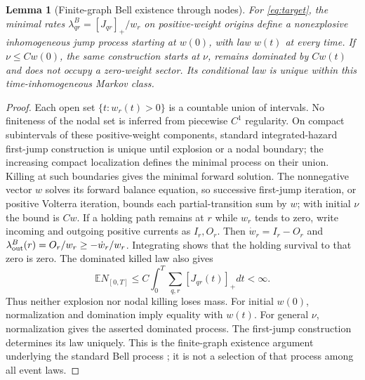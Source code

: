 \documentclass[11pt]{article}
\newtheorem{lemma}[theorem]{Lemma}
\theoremstyle{definition}\newtheorem{definition}[theorem]{Definition}
\theoremstyle{remark}\newtheorem{remark}[theorem]{Remark}
\begin{document}
\begin{lemma}[Finite-graph Bell existence through nodes]\label{kin:existence}
For \eqref{eq:target}, the minimal rates
$\lambda^B_{qr}=[J_{qr}]_+/w_r$ on positive-weight origins define a
nonexplosive inhomogeneous jump process starting at $w(0)$, with law
$w(t)$ at every time. If $\nu\le Cw(0)$, the same construction starts at
$\nu$, remains dominated by $Cw(t)$ and does not occupy a zero-weight
sector. Its conditional law is unique within this time-inhomogeneous
Markov class.
\end{lemma}
\begin{proof}
Each open set $\{t:w_r(t)>0\}$ is a countable union of intervals.
No finiteness of the nodal set is inferred from piecewise $C^1$ regularity.
On compact subintervals of these positive-weight components, standard
integrated-hazard first-jump construction is unique until explosion or a
nodal boundary; the increasing compact localization defines the minimal
process on their union. Killing at
such boundaries gives the minimal forward solution. The nonnegative
vector $w$ solves its forward balance equation, so successive first-jump
iteration, or positive Volterra iteration, bounds each partial-transition
sum by $w$; with initial $\nu$ the bound is $Cw$.
If a holding path remains at $r$ while $w_r$ tends to zero, write incoming
and outgoing positive currents as $I_r,O_r$. Then
$\dot w_r=I_r-O_r$ and
$\lambda^B_{\rm out}(r)=O_r/w_r\ge-\dot w_r/w_r$.
Integrating shows that the holding survival to that zero is zero.
The dominated killed law also gives
\[
 \mathbb E N_{[0,T]}\le
 C\int_0^T\sum_{q,r}[J_{qr}(t)]_+dt<\infty.
\]
Thus neither explosion nor nodal killing loses mass. For initial $w(0)$,
normalization and domination imply equality with $w(t)$. For general
$\nu$, normalization gives the asserted dominated process. The
first-jump construction determines its law uniquely. This is the
finite-graph existence argument underlying the standard Bell process
\cite{GeorgiiTumulka2005,Bell2005}; it is not a selection of that process among all event laws.
\end{proof}
\end{document}
